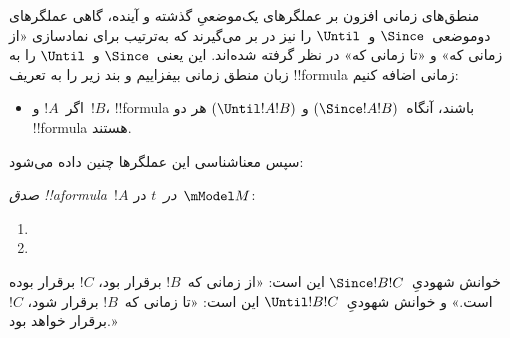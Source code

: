 \documentclass[../../../include/open-logic-section]{subfiles}
\begin{document}


منطق‌های زمانی افزون بر عملگرهای یک‌موضعیِ گذشته و آینده، گاهی
عملگرهای دوموضعی~$\Since$ و~$\Until$ را نیز در بر می‌گیرند که به‌ترتیب
برای نمادسازی «از زمانی که» و «تا زمانی که» در نظر گرفته شده‌اند. این
یعنی~$\Since$ و~$\Until$ را به زبان منطق زمانی بیفزاییم و بند زیر را
به تعریف !!{formula} زمانی اضافه کنیم:

\begin{itemize}
\item[] اگر~$!A$ و~$!B$، !!{formula} باشند، آنگاه~$(\Since !A !B)$ و
  $(\Until !A !B)$ هر دو !!{formula} هستند.
\end{itemize}

سپس معناشناسی این عملگرها چنین داده می‌شود:

\begin{defn}
  \emph{صدق !!a{formula}~$!A$ در~$t$} در~$\mModel M$:
  \begin{enumerate}
  \item{} 
  \item{} 
  \end{enumerate} 
\end{defn}

خوانش شهودیِ~$\Since !B !C$ این است: «از زمانی که~$!B$ برقرار بود،
$!C$ برقرار بوده است.» و خوانش شهودیِ~$\Until !B !C$ این است: «تا
زمانی که~$!B$ برقرار شود، $!C$ برقرار خواهد بود.»
\end{document}
